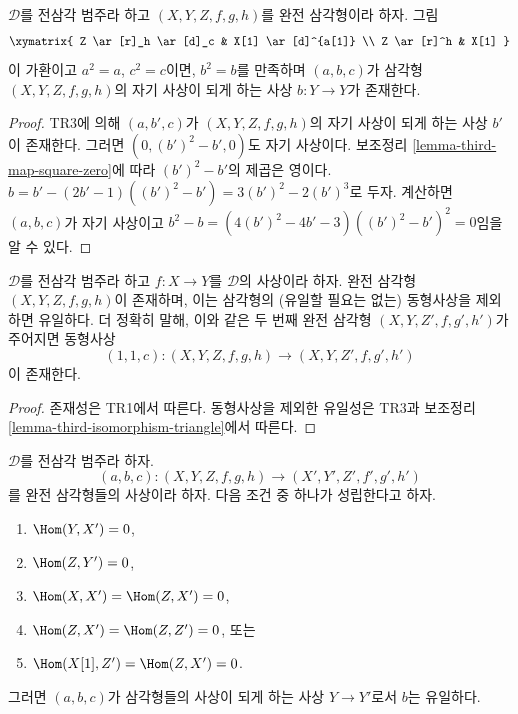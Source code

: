 \begin{lemma}
\label{lemma-third-map-idempotent}
$\mathcal{D}$를 전삼각 범주라 하고
$(X, Y, Z, f, g, h)$를 완전 삼각형이라 하자. 그림
$$
\xymatrix{
Z \ar[r]_h \ar[d]_c & X[1] \ar[d]^{a[1]} \\
Z \ar[r]^h & X[1]
}
$$
이 가환이고 $a^2 = a$, $c^2 = c$이면, $b^2 = b$를 만족하며
$(a, b, c)$가 삼각형 $(X, Y, Z, f, g, h)$의 자기 사상이 되게 하는
사상 $b : Y \to Y$가 존재한다.
\end{lemma}

\begin{proof}
TR3에 의해 $(a, b', c)$가 $(X, Y, Z, f, g, h)$의 자기 사상이
되게 하는 사상 $b'$이 존재한다. 그러면
$(0, (b')^2 - b', 0)$도 자기 사상이다. 보조정리
\ref{lemma-third-map-square-zero}에 따라 $(b')^2 - b'$의 제곱은 영이다.
$b = b' - (2b' - 1)((b')^2 - b') = 3(b')^2 - 2(b')^3$로 두자.
계산하면 $(a, b, c)$가 자기 사상이고
$b^2 - b = (4(b')^2 - 4b' - 3)((b')^2 - b')^2 = 0$임을 알 수 있다.
\end{proof}

\begin{lemma}
\label{lemma-cone-triangle-unique-isomorphism}
$\mathcal{D}$를 전삼각 범주라 하고 $f : X \to Y$를
$\mathcal{D}$의 사상이라 하자. 완전 삼각형 $(X, Y, Z, f, g, h)$이
존재하며, 이는 삼각형의 (유일할 필요는 없는) 동형사상을 제외하면 유일하다.
더 정확히 말해, 이와 같은 두 번째 완전 삼각형
$(X, Y, Z', f, g', h')$가 주어지면 동형사상
$$
(1, 1, c) : (X, Y, Z, f, g, h) \longrightarrow (X, Y, Z', f, g', h')
$$
이 존재한다.
\end{lemma}

\begin{proof}
존재성은 TR1에서 따른다. 동형사상을 제외한 유일성은 TR3과 보조정리
\ref{lemma-third-isomorphism-triangle}에서 따른다.
\end{proof}

\begin{lemma}
\label{lemma-uniqueness-third-arrow}
$\mathcal{D}$를 전삼각 범주라 하자.
$$
(a, b, c) : (X, Y, Z, f, g, h) \to (X', Y', Z', f', g', h')
$$
를 완전 삼각형들의 사상이라 하자. 다음 조건 중 하나가 성립한다고 하자.
\begin{enumerate}
\item $\Hom(Y, X') = 0$,
\item $\Hom(Z, Y') = 0$,
\item $\Hom(X, X') = \Hom(Z, X') = 0$,
\item $\Hom(Z, X') = \Hom(Z, Z') = 0$, 또는
\item $\Hom(X[1], Z') = \Hom(Z, X') = 0$.
\end{enumerate}
그러면 $(a, b, c)$가 삼각형들의 사상이 되게 하는 사상 $Y \to Y'$로서
$b$는 유일하다.
\end{lemma}

